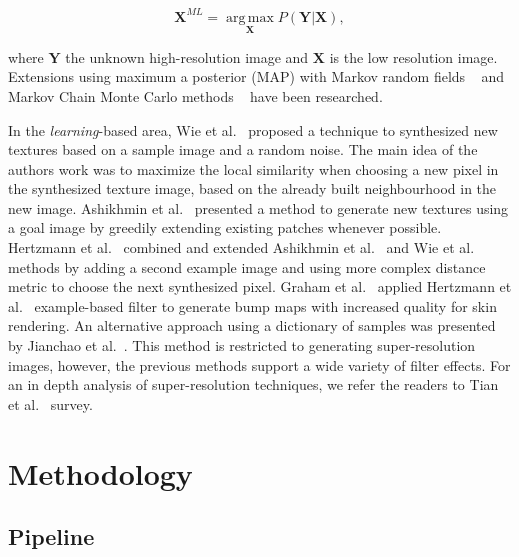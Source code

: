 \documentclass[11pt]{report}
\DeclareMathOperator*{\argmax}{arg\,max}
\begin{document}
\begin{equation}
\mathbf{X}^{ML} = \underset{\mathbf{X}}{\argmax} P(\mathbf{Y} | \mathbf{X}),
\end{equation} 

where $\mathbf{Y}$ the unknown high-resolution image and $\mathbf{X}$ is the low resolution image.
Extensions using maximum a posterior (MAP) with Markov random fields ~\cite{Humblot:2006} and Markov Chain Monte Carlo methods ~\cite{Tian:2010} have been researched.

In the \textit{learning}-based area, Wie et al.~\cite{Wei:2000} proposed a technique to synthesized new textures based on a sample image and a random noise.
The main idea of the authors work was to maximize the local similarity when choosing a new pixel in the synthesized texture image, based on the already built neighbourhood in the new image.
Ashikhmin et al.~\cite{Ashikhmin2001} presented a method to generate new textures using a goal image by greedily extending existing patches whenever possible.
Hertzmann et al.~\cite{Hertzmann2001} combined and extended Ashikhmin et al.~\cite{Ashikhmin2001} and Wie et al.~\cite{Wei:2000} methods by adding a second example image and using more complex distance metric to choose the next synthesized pixel.
Graham et al.~\cite{Graham2013} applied Hertzmann et al.~\cite{Hertzmann2001} example-based filter to generate bump maps with increased quality for skin rendering.
An alternative approach using a dictionary of samples was presented by Jianchao et al.~\cite{Jianchao2010}.
This method is restricted to generating super-resolution images, however, the previous methods support a wide variety of filter effects.
For an in depth analysis of super-resolution techniques, we refer the readers to Tian et al.~\cite{Tian2011} survey.




\chapter{Methodology}
\label{sec:methods}

\section{Pipeline}
\end{document}
